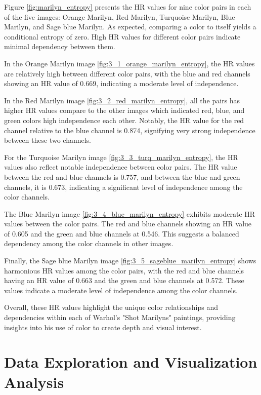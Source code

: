 \documentclass{article}
\begin{document}
Figure \ref{fig:marilyn_entropy} presents the HR values for nine color pairs in each of the five
images: Orange Marilyn, Red Marilyn, Turquoise Marilyn, Blue Marilyn,
and Sage blue Marilyn. As expected, comparing a color to itself yields a
conditional entropy of zero. High HR values for different color pairs
indicate minimal dependency between them.

In the Orange Marilyn image \ref{fig:3_1_orange_marilyn_entropy}, the HR values are relatively high
between different color pairs, with the blue and red channels showing an
HR value of 0.669, indicating a moderate level of independence.

In the Red Marilyn image \ref{fig:3_2_red_marilyn_entropy}, all the pairs has higher HR values compare
to the other images which indicated red, blue, and green colors high
independence each other. Notably, the HR value for the red channel
relative to the blue channel is 0.874, signifying very strong
independence between these two channels.

For the Turquoise Marilyn image \ref{fig:3_3_turq_marilyn_entropy}, the HR values also reflect notable
independence between color pairs. The HR value between the red and blue
channels is 0.757, and between the blue and green channels, it is 0.673,
indicating a significant level of independence among the color channels.

The Blue Marilyn image \ref{fig:3_4_blue_marilyn_entropy} exhibits moderate HR values between the color
pairs. The red and blue channels showing an HR value of 0.605 and the
green and blue channels at 0.546. This suggests a balanced dependency
among the color channels in other images.

Finally, the Sage blue Marilyn image \ref{fig:3_5_sageblue_marilyn_entropy} shows harmonious HR values
among the color pairs, with the red and blue channels having an HR value
of 0.663 and the green and blue channels at 0.572. These values indicate
a moderate level of independence among the color channels.

Overall, these HR values highlight the unique color relationships and
dependencies within each of Warhol's "Shot Marilyns" paintings,
providing insights into his use of color to create depth and visual
interest.

\hypertarget{data-exploration-and-visualization-analysis}{%
\section{Data Exploration and Visualization
Analysis}\label{data-exploration-and-visualization-analysis}}
\end{document}
